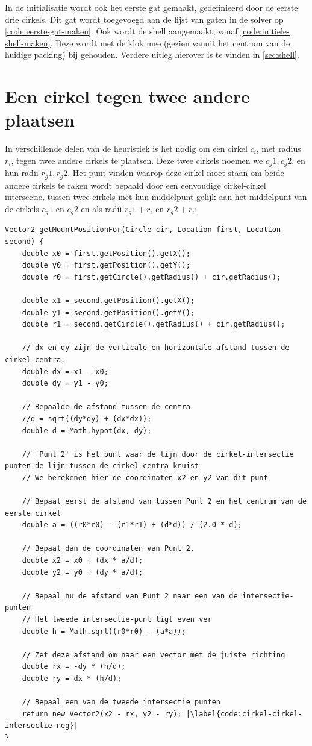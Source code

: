 \documentclass[12pt,a4paper,oneside]{book}
\begin{document}
In de initialisatie wordt ook het eerste gat gemaakt, gedefinieerd door de eerste drie cirkels.
Dit gat wordt toegevoegd aan de lijst van gaten in de solver op \autoref{code:eerste-gat-maken}.
Ook wordt de shell aangemaakt, vanaf \autoref{code:initiele-shell-maken}.
Deze wordt met de klok mee (gezien vanuit het centrum van de huidige packing) bij gehouden.
Verdere uitleg hierover is te vinden in \autoref{sec:shell}.

\section{Een cirkel tegen twee andere plaatsen} \label{sec:een-cirkel-tegen-twee-andere-plaatsen}

In verschillende delen van de heuristiek is het nodig om een cirkel $c_i$, met radius $r_i$, tegen twee andere cirkels te plaatsen.
Deze twee cirkels noemen we $c_g1, c_g2$, en hun radii $r_g1, r_g2$.
Het punt vinden waarop deze cirkel moet staan om beide andere cirkels te raken wordt bepaald door een eenvoudige cirkel-cirkel intersectie, tussen twee cirkels met hun middelpunt gelijk aan het middelpunt van de cirkels $c_g1$ en $c_g2$ en als radii $r_g1+r_i$ en $r_g2+r_i$:

\begin{lstlisting}
Vector2 getMountPositionFor(Circle cir, Location first, Location second) {
	double x0 = first.getPosition().getX();
	double y0 = first.getPosition().getY();
	double r0 = first.getCircle().getRadius() + cir.getRadius();

	double x1 = second.getPosition().getX();
	double y1 = second.getPosition().getY();
	double r1 = second.getCircle().getRadius() + cir.getRadius();

	// dx en dy zijn de verticale en horizontale afstand tussen de cirkel-centra.
	double dx = x1 - x0;
	double dy = y1 - y0;

	// Bepaalde de afstand tussen de centra
	//d = sqrt((dy*dy) + (dx*dx));
	double d = Math.hypot(dx, dy);

	// 'Punt 2' is het punt waar de lijn door de cirkel-intersectie punten de lijn tussen de cirkel-centra kruist
	// We berekenen hier de coordinaten x2 en y2 van dit punt

	// Bepaal eerst de afstand van tussen Punt 2 en het centrum van de eerste cirkel
	double a = ((r0*r0) - (r1*r1) + (d*d)) / (2.0 * d);

	// Bepaal dan de coordinaten van Punt 2.
	double x2 = x0 + (dx * a/d);
	double y2 = y0 + (dy * a/d);

	// Bepaal nu de afstand van Punt 2 naar een van de intersectie-punten
	// Het tweede intersectie-punt ligt even ver
	double h = Math.sqrt((r0*r0) - (a*a));

	// Zet deze afstand om naar een vector met de juiste richting
	double rx = -dy * (h/d);
	double ry = dx * (h/d);

	// Bepaal een van de tweede intersectie punten
	return new Vector2(x2 - rx, y2 - ry); |\label{code:cirkel-cirkel-intersectie-neg}|
}
\end{lstlisting}
\end{document}
